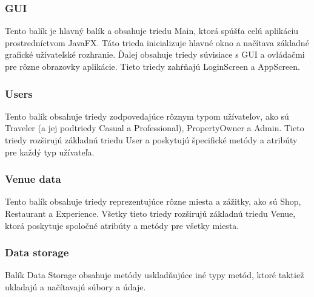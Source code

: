 \documentclass{article}
\begin{document}
\subsubsection{GUI}
Tento balík je hlavný balík a obsahuje triedu Main, ktorá spúšťa celú aplikáciu prostredníctvom JavaFX. Táto trieda inicializuje hlavné okno a načítava základné grafické užívateľské rozhranie. Ďalej obsahuje triedy súvisiace s GUI a ovládačmi pre rôzne obrazovky aplikácie. Tieto triedy zahŕňajú LoginScreen a AppScreen.
\subsubsection{Users}
Tento balík obsahuje triedy zodpovedajúce rôznym typom užívateľov, ako sú Traveler (a jej podtriedy Casual a Professional), PropertyOwner a Admin. Tieto triedy rozširujú základnú triedu User a poskytujú špecifické metódy a atribúty pre každý typ užívateľa.
\subsubsection{Venue data}
Tento balík obsahuje triedy reprezentujúce rôzne miesta a zážitky, ako sú Shop, Restaurant a Experience. Všetky tieto triedy rozširujú základnú triedu Venue, ktorá poskytuje spoločné atribúty a metódy pre všetky miesta.
\subsubsection{Data storage}
Balík Data Storage obsahuje metódy uskladňujúce iné typy metód, ktoré taktiež ukladajú a načítavajú súbory a údaje.
\end{document}
